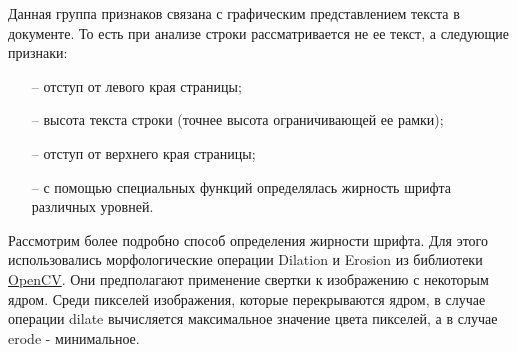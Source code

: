 \documentclass[a4paper,12pt]{article}
\begin{document}
\begin{itemize}
	Данная группа признаков связана с графическим представлением текста в документе. То есть при анализе строки рассматривается не ее текст, а следующие признаки:

	\begin{itemize}

		\item[--] отступ от левого края страницы;
		\item[--] высота текста строки (точнее высота ограничивающей ее рамки);
		\item[--] отступ от верхнего края страницы;
		\item[--] с помощью специальных функций определялась жирность шрифта различных уровней.

	\end{itemize}

\end{itemize}

Рассмотрим более подробно способ определения жирности шрифта. Для этого использовались морфологические операции Dilation и Erosion из библиотеки \href{https://docs.opencv.org/2.4/doc/tutorials/imgproc/erosion_dilatation/erosion_dilatation.html}{OpenCV}. Они предполагают применение свертки к изображению с некоторым ядром. Среди пикселей изображения, которые перекрываются ядром, в случае операции dilate вычисляется максимальное значение цвета пикселей, а в случае erode - минимальное. 
\end{document}
